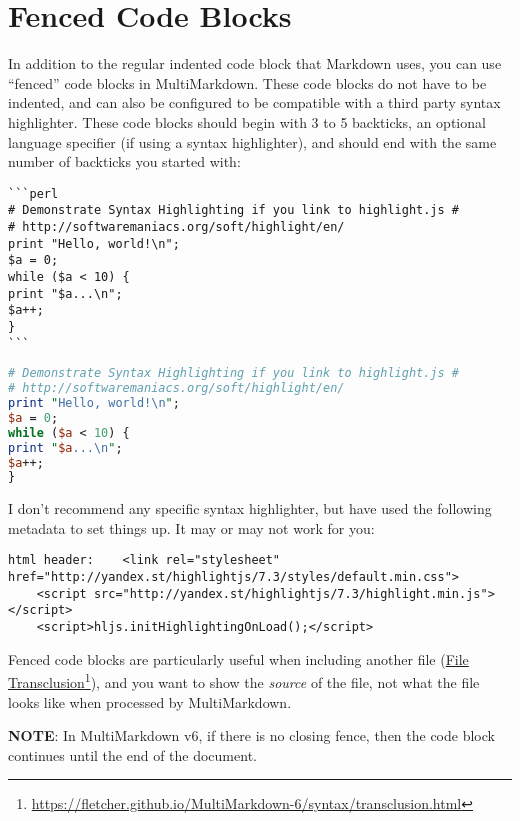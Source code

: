 
\def\mytitle{Fenced Code Blocks}
\def\myauthor{Fletcher T. Penney}
\def\revised{2018-06-30}




\tableofcontents

\section{Fenced Code Blocks}
\label{fencedcodeblocks}

In addition to the regular indented code block that Markdown uses, you can use ``fenced'' code blocks in MultiMarkdown. These code blocks do not have to be indented, and can also be configured to be compatible with a third party syntax highlighter. These code blocks should begin with 3 to 5 backticks, an optional language specifier (if using a syntax highlighter), and should end with the same number of backticks you started with:

\begin{verbatim}
```perl
# Demonstrate Syntax Highlighting if you link to highlight.js #
# http://softwaremaniacs.org/soft/highlight/en/
print "Hello, world!\n";
$a = 0;
while ($a < 10) {
print "$a...\n";
$a++;
}
```
\end{verbatim}

\begin{lstlisting}[language=perl]
# Demonstrate Syntax Highlighting if you link to highlight.js #
# http://softwaremaniacs.org/soft/highlight/en/
print "Hello, world!\n";
$a = 0;
while ($a < 10) {
print "$a...\n";
$a++;
}
\end{lstlisting}

I don't recommend any specific syntax highlighter, but have used the following metadata to set things up. It may or may not work for you:

\begin{verbatim}
html header:	<link rel="stylesheet" href="http://yandex.st/highlightjs/7.3/styles/default.min.css">
	<script src="http://yandex.st/highlightjs/7.3/highlight.min.js"></script>
	<script>hljs.initHighlightingOnLoad();</script>
\end{verbatim}

Fenced code blocks are particularly useful when including another file (\href{https://fletcher.github.io/MultiMarkdown-6/syntax/transclusion.html}{File Transclusion}\footnote{\href{https://fletcher.github.io/MultiMarkdown-6/syntax/transclusion.html}{https:\slash{}\slash{}fletcher.github.io\slash{}MultiMarkdown-6\slash{}syntax\slash{}transclusion.html}}), and you want to show the \emph{source} of the file, not what the file looks like when processed by MultiMarkdown.

\textbf{NOTE}: In MultiMarkdown v6, if there is no closing fence, then the code block continues until the end of the document.



